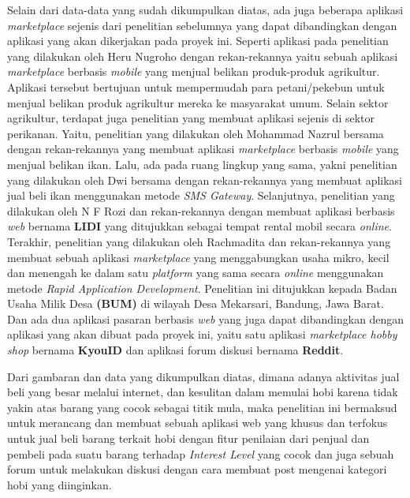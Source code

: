 \documentclass[a4paper]{article}
\begin{document}
Selain dari data-data yang sudah dikumpulkan diatas, ada juga beberapa aplikasi \textit{marketplace} sejenis dari penelitian sebelumnya yang dapat dibandingkan dengan aplikasi yang akan dikerjakan pada proyek ini. Seperti aplikasi pada penelitian yang dilakukan oleh Heru Nugroho dengan rekan-rekannya yaitu sebuah aplikasi \textit{marketplace} berbasis \textit{mobile} yang menjual belikan produk-produk agrikultur. Aplikasi tersebut bertujuan untuk mempermudah para petani/pekebun untuk menjual belikan produk agrikultur mereka ke masyarakat umum\autocite{agriculture-marketplace}. Selain sektor agrikultur, terdapat juga penelitian yang membuat aplikasi sejenis di sektor perikanan. Yaitu, penelitian yang dilakukan oleh Mohammad Nazrul bersama dengan rekan-rekannya yang membuat aplikasi \textit{marketplace} berbasis \textit{mobile} yang menjual belikan ikan\autocite{fishes-marketplace}. Lalu, ada pada ruang lingkup yang sama, yakni penelitian yang dilakukan oleh Dwi bersama dengan rekan-rekannya yang membuat aplikasi jual beli ikan menggunakan metode \textit{SMS Gateway}\autocite{c2c-fish-marketplace}. Selanjutnya, penelitian yang dilakukan oleh N F Rozi dan rekan-rekannya dengan membuat aplikasi berbasis \textit{web} bernama \textbf{LIDI} yang ditujukkan sebagai tempat rental mobil secara \textit{online}\autocite{lidi-car-rental}. Terakhir, penelitian yang dilakukan oleh Rachmadita dan rekan-rekannya yang membuat sebuah aplikasi \textit{marketplace} yang menggabungkan usaha mikro, kecil dan menengah ke dalam satu \textit{platform} yang sama secara \textit{online} menggunakan metode \textit{Rapid Application Development}. Penelitian ini ditujukkan kepada Badan Usaha Milik Desa \textbf{(BUM)} di wilayah Desa Mekarsari, Bandung, Jawa Barat\autocite{bum-mekarsari}. Dan ada dua aplikasi pasaran berbasis \textit{web} yang juga dapat dibandingkan dengan aplikasi yang akan dibuat pada proyek ini, yaitu satu aplikasi \textit{marketplace hobby shop} bernama \textbf{KyouID} dan aplikasi forum diskusi bernama \textbf{Reddit}.

Dari gambaran dan data yang dikumpulkan diatas, dimana adanya aktivitas jual beli yang besar melalui internet, dan kesulitan dalam memulai hobi karena tidak yakin atas barang yang cocok sebagai titik mula, maka penelitian ini bermaksud untuk merancang dan membuat sebuah aplikasi web yang khusus dan terfokus untuk jual beli barang terkait hobi dengan fitur penilaian dari penjual dan pembeli pada suatu barang terhadap \textit{Interest Level} yang cocok dan juga sebuah forum untuk melakukan diskusi dengan cara membuat post mengenai kategori hobi yang diinginkan.
\end{document}
